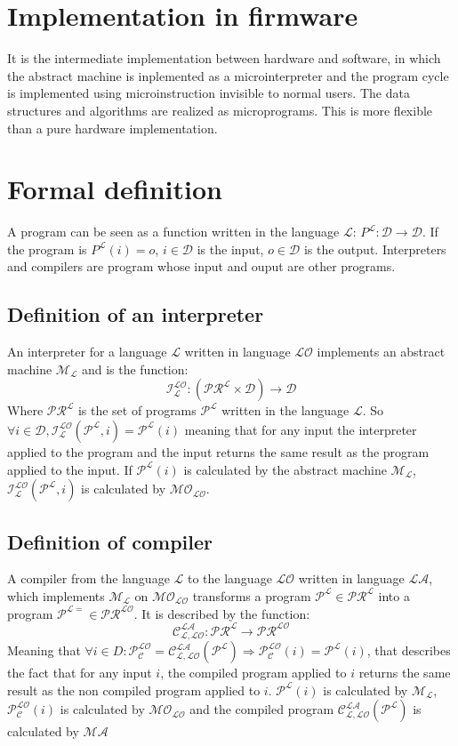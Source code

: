 \section{Implementation in firmware}
It is the intermediate implementation between hardware and software, in which the abstract machine is inplemented as a microinterpreter and the program cycle is implemented using 
microinstruction invisible to normal users. The data structures and algorithms are realized as microprograms. This is more flexible than a pure hardware implementation.
\section{Formal definition}
A program can be seen as a function written in the language $\mathcal{L}$: $P^\mathcal{L}:\mathcal{D}\rightarrow\mathcal{D}$. If the program is $P^\mathcal{L}(i)=o$, $i\in\mathcal{D}$ is
the input, $o\in\mathcal{D}$ is the output. Interpreters and compilers are program whose input and ouput are other programs.
\subsection{Definition of an interpreter}
An interpreter for a language $\mathcal{L}$ written in language $\mathcal{LO}$ implements an abstract machine $\mathcal{M_L}$ and is the function:
\begin{equation}
\mathcal{I_L^{LO}}:(\mathcal{PR^L}\times\mathcal{D})\rightarrow\mathcal{D}
\end{equation}
Where $\mathcal{PR^L}$ is the set of programs $\mathcal{P^L}$ written in the language $\mathcal{L}$. So $\forall i\in\mathcal{D},\mathcal{I_L^{LO}}(\mathcal{P^L},i)=\mathcal{P^L}(i)$ 
meaning that for any input the interpreter applied to the program and the input returns the same result as the program applied to the input. If $\mathcal{P^L}(i)$ is calculated by 
the abstract machine $\mathcal{M_L}$, $\mathcal{I_L^{LO}}(\mathcal{P^L},i)$ is calculated by $\mathcal{MO_{LO}}$.
\subsection{Definition of compiler}
A compiler from the language $\mathcal{L}$ to the language $\mathcal{LO}$ written in language $\mathcal{LA}$, which implements $\mathcal{M_L}$ on $\mathcal{MO_{LO}}$ transforms a program
$\mathcal{P^L}\in \mathcal{PR^L}$ into a program $\mathcal{P^{L=}}\in \mathcal{PR^{LO}}$. It is described by the function:
\begin{equation}
\mathcal{C_{L,LO}^{LA}}: \mathcal{PR^L}\rightarrow \mathcal{PR^{LO}}
\end{equation}
Meaning that $\forall i\in D: \mathcal{P_C^{LO}}=\mathcal{C_{L,LO}^{LA}}(\mathcal{P^L})\Rightarrow \mathcal{P_C^{LO}}(i)=\mathcal{P^L}(i)$, that describes the fact that for any input $i$,
the compiled program applied to $i$ returns the same result as the non compiled program applied to $i$. $\mathcal{P^L}(i)$ is calculated by $\mathcal{M_L}$, $\mathcal{P^{LO}_C}(i)$ is calculated by $\mathcal{MO_{LO}}$ and the compiled program $\mathcal{C^{LA}_{L,LO}}(\mathcal{P^L})$ is calculated by $\mathcal{MA}$